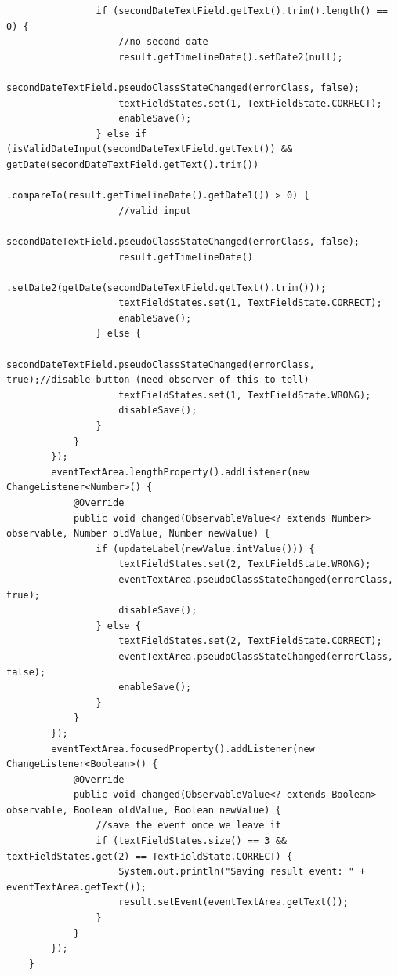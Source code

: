 \begin{lstlisting}
                if (secondDateTextField.getText().trim().length() == 0) {
                    //no second date
                    result.getTimelineDate().setDate2(null);
                    secondDateTextField.pseudoClassStateChanged(errorClass, false);
                    textFieldStates.set(1, TextFieldState.CORRECT);
                    enableSave();
                } else if (isValidDateInput(secondDateTextField.getText()) && getDate(secondDateTextField.getText().trim())
                		.compareTo(result.getTimelineDate().getDate1()) > 0) {
                    //valid input
                    secondDateTextField.pseudoClassStateChanged(errorClass, false);
                    result.getTimelineDate()
                    	.setDate2(getDate(secondDateTextField.getText().trim()));
                    textFieldStates.set(1, TextFieldState.CORRECT);
                    enableSave();
                } else {
                    secondDateTextField.pseudoClassStateChanged(errorClass, true);//disable button (need observer of this to tell)
                    textFieldStates.set(1, TextFieldState.WRONG);
                    disableSave();
                }
            }
        });
        eventTextArea.lengthProperty().addListener(new ChangeListener<Number>() {
            @Override
            public void changed(ObservableValue<? extends Number> observable, Number oldValue, Number newValue) {
                if (updateLabel(newValue.intValue())) {
                    textFieldStates.set(2, TextFieldState.WRONG);
                    eventTextArea.pseudoClassStateChanged(errorClass, true);
                    disableSave();
                } else {
                    textFieldStates.set(2, TextFieldState.CORRECT);
                    eventTextArea.pseudoClassStateChanged(errorClass, false);
                    enableSave();
                }
            }
        });
        eventTextArea.focusedProperty().addListener(new ChangeListener<Boolean>() {
            @Override
            public void changed(ObservableValue<? extends Boolean> observable, Boolean oldValue, Boolean newValue) {
                //save the event once we leave it
                if (textFieldStates.size() == 3 && textFieldStates.get(2) == TextFieldState.CORRECT) {
                    System.out.println("Saving result event: " + eventTextArea.getText());
                    result.setEvent(eventTextArea.getText());
                }
            }
        });
    }


\end{lstlisting}
